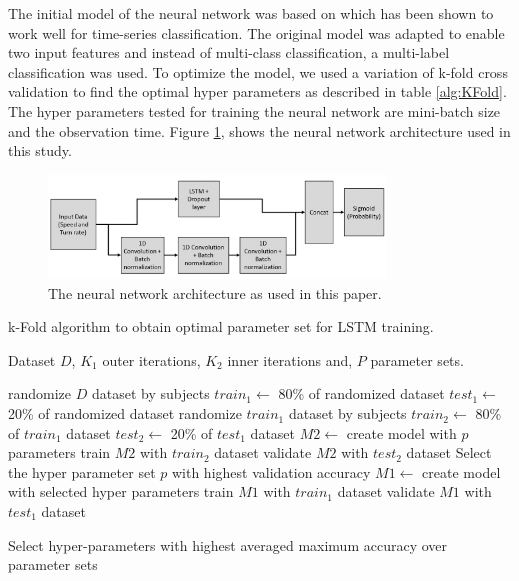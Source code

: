 \documentclass{article}
\begin{document}

The initial model of the neural network was based on \cite{karim2018lstm} which has been shown to work well for time-series classification. The original model was adapted to enable two input features and instead of multi-class classification, a multi-label classification was used. To optimize the model, we used a variation of k-fold cross validation to find the optimal hyper parameters as described in table \ref{alg:KFold}. The hyper parameters tested for training the neural network are mini-batch size and the observation time. Figure \ref{fig:NNarchitecture}, shows the neural network architecture used in this study.


\begin{figure}[ht!]
\centering
\includegraphics[width=0.8\textwidth]{images/LSTM_pictorial.png}
\caption[width=0.5\textwidth]{The neural network architecture as used in this paper. }
\label{fig:NNarchitecture}
\end{figure}


\begin{algorithm}
\caption{k-Fold algorithm to obtain optimal parameter set for LSTM training.}\label{alg:KFold}
Dataset $D$, $K_1$ outer iterations, $K_2$ inner iterations and, $P$ parameter sets.
\begin{algorithmic}
    
    \State randomize $D$ dataset by subjects
    \State $train_1 \gets $ 80\% of randomized dataset
     \State $test_1 \gets $ 20\% of randomized dataset
        \State randomize $train_1$ dataset by subjects
        \State $train_2 \gets $ 80\% of $train_1$ dataset
        \State $test_2 \gets $ 20\% of $test_1$ dataset
            \State $M2 \gets$ create model with $p$ parameters
            \State train $M2$ with $train_2$ dataset
            \State validate $M2$ with $test_2$ dataset
        \EndFor
    \EndFor
    \State Select the hyper parameter set $p$ with highest validation accuracy
    \State $M1 \gets$ create model with selected hyper parameters
    \State train $M1$ with $train_1$ dataset
    \State validate $M1$ with $test_1$ dataset
\EndFor

\State Select hyper-parameters with highest averaged maximum accuracy over parameter sets
\end{algorithmic}
\end{algorithm}
\end{document}

